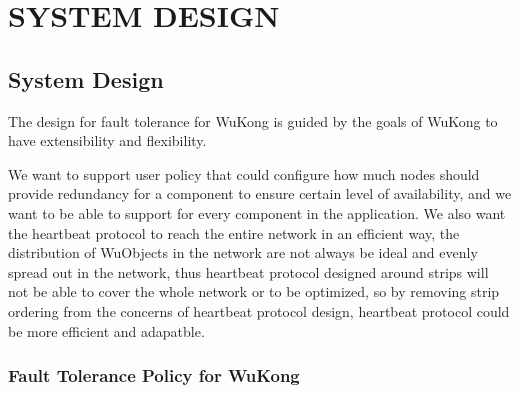 \cleardoublepage
\singlespacing
\chapter{SYSTEM DESIGN}
\label{c:design}
\doublespacing\nointerlineskip

\section{System Design}
\label{s:sd}

The design for fault tolerance for WuKong is guided by the goals of WuKong to
have extensibility and flexibility. 

We want to support user policy that could configure how much nodes
should provide redundancy for a component to ensure certain level of
availability, and we want to be able to support for every component in the
application.  We also want the heartbeat protocol to reach the entire network in
an efficient way, the distribution of WuObjects in the network are not always be
ideal and evenly spread out in the network, thus heartbeat protocol designed
around strips will not be able to cover the whole network or to be optimized, so
by removing strip ordering from the concerns of heartbeat protocol design,
heartbeat protocol could be more efficient and adapatble.

\subsection{Fault Tolerance Policy for WuKong}

